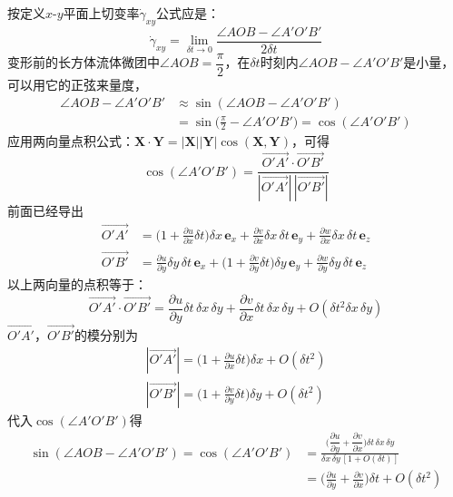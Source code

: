 按定义$x\text{-}y$平面上切变率$\dot{\gamma}_{xy}$公式应是：
\begin{equation*}
\dot{\gamma}_{xy}=\lim_{\delta t\to 0}\frac{\angle AOB-\angle A'O'B'}{2\delta t}
\tag{2.28}
\end{equation*}
变形前的长方体流体微团中$\angle AOB=\dfrac{\pi}{2}$，在$\delta t$时刻内$\angle AOB-\angle A'O'B'$是小量，可以用它的正弦来量度，
\begin{align*}
\angle AOB-\angle A'O'B'&\approx\sin(\angle AOB-\angle A'O'B')\\
&=\sin\Big(\frac{\pi}{2}-\angle A'O'B'\Big)=\cos(\angle A'O'B')
\end{align*}
应用两向量点积公式：$\boldsymbol{X}\cdot\boldsymbol{Y}=|\boldsymbol{X}||\boldsymbol{Y}|\cos(\boldsymbol{X},\boldsymbol{Y})$，可得
\[
\cos(\angle A'O'B')=\frac{\overrightarrow{O'A'}\cdot\overrightarrow{O'B'}}{|\overrightarrow{O'A'}|\,|\overrightarrow{O'B'}|}
\]
前面已经导出
\begin{align*}
\overrightarrow{O'A'}&=\Big(1+\frac{\partial u}{\partial x}\delta t\Big)\delta x\,\boldsymbol{e}_x+\frac{\partial v}{\partial x}\delta x\,\delta t\,\boldsymbol{e}_y+\frac{\partial w}{\partial x}\delta x\,\delta t\,\boldsymbol{e}_z\\
\overrightarrow{O'B'}&=\frac{\partial u}{\partial y}\delta y\,\delta t\,\boldsymbol{e}_x+\Big(1+\frac{\partial v}{\partial y}\delta t\Big)\delta y\,\boldsymbol{e}_y+\frac{\partial w}{\partial y}\delta y\,\delta t\,\boldsymbol{e}_z
\end{align*}
以上两向量的点积等于：
\[
\overrightarrow{O'A'}\cdot\overrightarrow{O'B'}=\frac{\partial u}{\partial y}\delta t\,\delta x\,\delta y+\frac{\partial v}{\partial x}\delta t\,\delta x\,\delta y+O(\delta t^{2}\delta x\,\delta y)
\]
$\overrightarrow{O'A'}$，$\overrightarrow{O'B'}$的模分别为
\begin{gather*}
|\overrightarrow{O'A'}|=\Big(1+\frac{\partial u}{\partial x}\delta t\Big)\delta x+O(\delta t^{2})\\[2pt]
|\overrightarrow{O'B'}|=\Big(1+\frac{\partial v}{\partial y}\delta t\Big)\delta y+O(\delta t^{2})
\end{gather*}
代入$\cos(\angle A'O'B')$得
\begin{align*}
\sin(\angle AOB-\angle A'O'B')=\cos(\angle A'O'B')&=\frac{\Big(\dfrac{\partial u}{\partial y}+\dfrac{\partial v}{\partial x}\Big)\delta t\,\delta x\,\delta y}{\delta x\,\delta y\,[1+O(\delta t)]}\\
&=\Big(\frac{\partial u}{\partial y}+\frac{\partial v}{\partial x}\Big)\delta t+O(\delta t^{2})
\end{align*}
